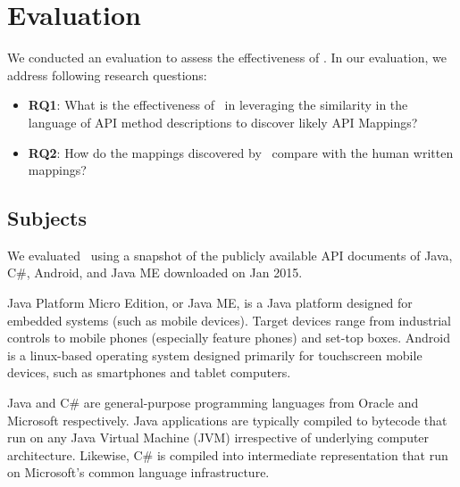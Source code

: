 \section{Evaluation}
\label{sec:evaluation}

We conducted an evaluation to assess the effectiveness of \tool. In our evaluation, we address following research questions:

\begin{itemize}
	
\item\textbf{RQ1}: What is the effectiveness of \tool\ in leveraging the similarity in the language of API method descriptions to discover likely API Mappings?

\item\textbf{RQ2}: How do the mappings discovered by \tool\ compare with the human written mappings?


\end{itemize}

\subsection{Subjects}
\label{sub:subject}


We evaluated \tool\ using a snapshot of the publicly available API documents of Java, C\#, Android, and Java ME downloaded on Jan 2015. 

Java Platform Micro Edition, or Java ME, is a Java platform designed for embedded systems (such as mobile devices). Target devices range from industrial controls to mobile phones (especially feature phones) and set-top boxes.
Android is a linux-based operating system designed primarily for touchscreen mobile devices, such as smartphones and tablet computers.

Java and C\# are general-purpose programming languages from Oracle and Microsoft respectively. Java applications are typically compiled to bytecode that run on any Java Virtual Machine (JVM) irrespective of underlying computer architecture.
Likewise, C\# is compiled into intermediate representation that run on Microsoft's common language infrastructure.


